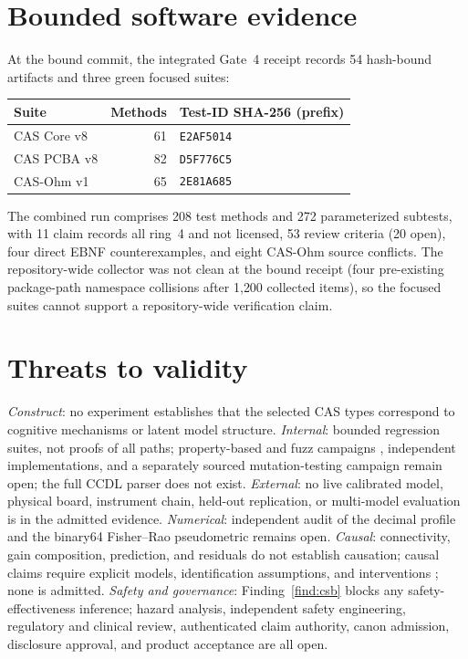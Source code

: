 \documentclass[11pt]{amsart}
\theoremstyle{definition}
\theoremstyle{remark}
\begin{document}
\section{Bounded software evidence}

At the bound commit, the integrated Gate~4 receipt records 54 hash-bound artifacts and three green focused suites:

\begin{center}
\small
\begin{tabular}{@{}lrl@{}}
\toprule
Suite & Methods & Test-ID SHA-256 (prefix) \\
\midrule
CAS Core v8 & 61 & \texttt{E2AF5014} \\
CAS PCBA v8 & 82 & \texttt{D5F776C5} \\
CAS-Ohm v1 & 65 & \texttt{2E81A685} \\
\bottomrule
\end{tabular}
\end{center}

The combined run comprises 208 test methods and 272 parameterized subtests, with 11 claim records all ring~4 and not licensed, 53 review criteria (20 open), four direct EBNF counterexamples, and eight CAS-Ohm source conflicts. The repository-wide collector was not clean at the bound receipt (four pre-existing package-path namespace collisions after 1{,}200 collected items), so the focused suites cannot support a repository-wide verification claim.

\section{Threats to validity}

\emph{Construct}: no experiment establishes that the selected CAS types correspond to cognitive mechanisms or latent model structure. \emph{Internal}: bounded regression suites, not proofs of all paths; property-based and fuzz campaigns \cite{quickcheck}, independent implementations, and a separately sourced mutation-testing campaign remain open; the full CCDL parser does not exist. \emph{External}: no live calibrated model, physical board, instrument chain, held-out replication, or multi-model evaluation is in the admitted evidence. \emph{Numerical}: independent audit of the decimal profile and the binary64 Fisher--Rao pseudometric remains open. \emph{Causal}: connectivity, gain composition, prediction, and residuals do not establish causation; causal claims require explicit models, identification assumptions, and interventions \cite{pearl}; none is admitted. \emph{Safety and governance}: Finding~\ref{find:csb} blocks any safety-effectiveness inference; hazard analysis, independent safety engineering, regulatory and clinical review, authenticated claim authority, canon admission, disclosure approval, and product acceptance are all open.
\end{document}
